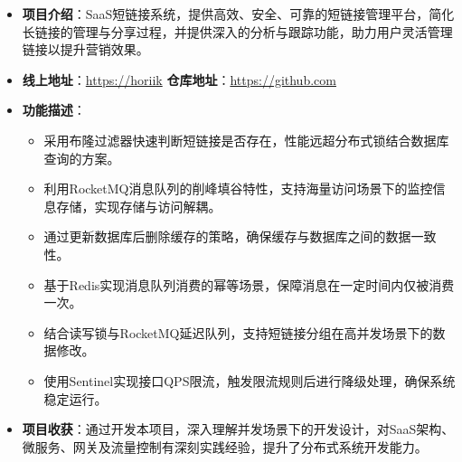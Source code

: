 \documentclass{../../styles/resume}
\begin{document}
\begin{itemize}[leftmargin=*, labelsep=0.5em]
  \item \textbf{项目介绍}：SaaS短链接系统，提供高效、安全、可靠的短链接管理平台，简化长链接的管理与分享过程，并提供深入的分析与跟踪功能，助力用户灵活管理链接以提升营销效果。
  \item \textbf{线上地址}：\url{https://horiik} \quad \textbf{仓库地址}：\url{https://github.com}
  \item \textbf{功能描述}：
    \begin{itemize}
      \item 采用布隆过滤器快速判断短链接是否存在，性能远超分布式锁结合数据库查询的方案。
      \item 利用RocketMQ消息队列的削峰填谷特性，支持海量访问场景下的监控信息存储，实现存储与访问解耦。
      \item 通过更新数据库后删除缓存的策略，确保缓存与数据库之间的数据一致性。
      \item 基于Redis实现消息队列消费的幂等场景，保障消息在一定时间内仅被消费一次。
      \item 结合读写锁与RocketMQ延迟队列，支持短链接分组在高并发场景下的数据修改。
      \item 使用Sentinel实现接口QPS限流，触发限流规则后进行降级处理，确保系统稳定运行。
    \end{itemize}
  \item \textbf{项目收获}：通过开发本项目，深入理解并发场景下的开发设计，对SaaS架构、微服务、网关及流量控制有深刻实践经验，提升了分布式系统开发能力。
\end{itemize}
\end{document}
